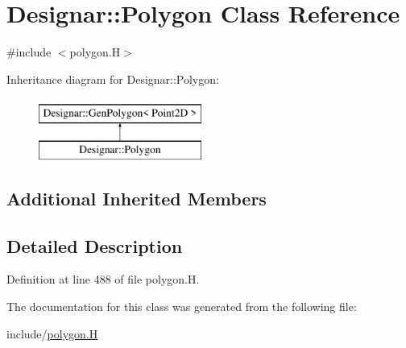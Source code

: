 \hypertarget{class_designar_1_1_polygon}{}\section{Designar\+:\+:Polygon Class Reference}
\label{class_designar_1_1_polygon}


{\ttfamily \#include $<$polygon.\+H$>$}

Inheritance diagram for Designar\+:\+:Polygon\+:\begin{figure}[H]
\begin{center}
\leavevmode
\includegraphics[height=2.000000cm]{class_designar_1_1_polygon}
\end{center}
\end{figure}
\subsection*{Additional Inherited Members}


\subsection{Detailed Description}


Definition at line 488 of file polygon.\+H.



The documentation for this class was generated from the following file\+:\begin{DoxyCompactItemize}
\item 
include/\hyperlink{polygon_8_h}{polygon.\+H}\end{DoxyCompactItemize}
